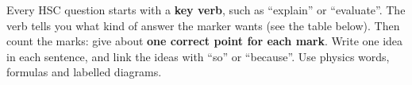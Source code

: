 
\newcommand\ansPt[1]{\textcolor{hscbrand}{\bfseries(#1)}}

Every HSC question starts with a \textbf{key verb}, such as ``explain'' or ``evaluate''.
The verb tells you what kind of answer the marker wants (see the table below). Then count the
marks: give about \textbf{one correct point for each mark}. Write one idea in each sentence,
and link the ideas with ``so'' or ``because''. Use physics words, formulas and labelled
diagrams.

